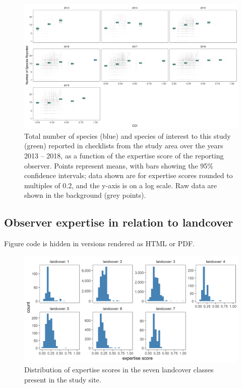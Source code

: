 \documentclass[]{article}
\begin{document}
\begin{figure}
\centering
\includegraphics{figs/fig_nsp_score.png}
\caption{Total number of species (blue) and species of interest to this study (green) reported in checklists from the study area over the years 2013 -- 2018, as a function of the expertise score of the reporting observer. Points represent means, with bars showing the 95\% confidence intervals; data shown are for expertise scores rounded to multiples of 0.2, and the y-axis is on a log scale. Raw data are shown in the background (grey points).}
\end{figure}

\hypertarget{observer-expertise-in-relation-to-landcover}{%
\subsection{Observer expertise in relation to landcover}\label{observer-expertise-in-relation-to-landcover}}

Figure code is hidden in versions rendered as HTML or PDF.

\begin{figure}
\centering
\includegraphics{figs/fig_exp_lc.png}
\caption{Distribution of expertise scores in the seven landcover classes present in the study site.}
\end{figure}
\end{document}
